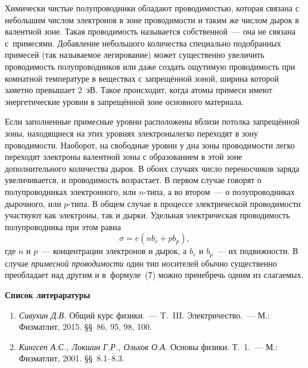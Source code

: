 Химически чистые полупроводники обладают проводимостью, которая связана с небольшим числом электронов в зоне
проводимости и таким же числом дырок в валентной зоне. Такая проводимость называется {собственной}~--- она не
связана с~примесями. Добавление небольшого количества специально подобранных примесей (так называемое
{легирование}) может существенно увеличить проводимость полупроводников или даже создать ощутимую проводимость при
комнатной температуре в веществах с запрещённой зоной, ширина которой заметно превышает 2~эВ. Такое происходит, когда атомы примеси имеют энергетические уровни в запрещённой зоне основного материала.

Если заполненные примесные уровни расположены вблизи потолка запрещённой зоны, находящиеся на этих уровнях электронылегко переходят в зону проводимости. Наоборот, на свободные уровни у дна зоны проводимости легко переходят электроны валентной зоны с образованием в этой зоне дополнительного количества дырок. В обоих случаях число переносчиков заряда увеличивается, и проводимость возрастает. В первом случае говорят о полупроводниках {электронного}, или $n$-типа, а во втором~--- о  полупроводниках дырочного, или $p$-типа. В общем случае в процессе электрической проводимости участвуют как электроны, так и дырки. Удельная электрическая проводимость полупроводника при этом равна
\begin{equation}
\sigma=e(nb_e+pb_p),
\end{equation}
где $n$ и $p$~--- концентрации электронов и дырок, а $b_e$ и $b_p$~--- их подвижности. В случае \textit{примесной
проводимости} один тип носителей обычно существенно преобладает над другим и в~формуле~(\r7) можно пренебречь одним из слагаемых.


{\small


{\bf \Large Список литераратуры}

\begin{enumerate}
\item{ \emph{Сивухин Д.В.} Общий курс физики.~--- T.~III. Электричество.~--- М.: Физматлит, 2015. \S\S~86, 95, 98, 100.}
\item{ \emph{Кингсеп А.С., Локшин Г.Р., Ольхов О.А.} Основы физики. Т.~1.~--- М.: Физматлит, 2001. \S\S~8.1--8.3.}
\end{enumerate}


}